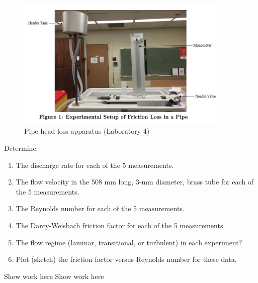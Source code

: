 \documentclass[12pt]{article}
\begin{document}
\begin{figure}[h!] %
   \centering
   \includegraphics[width=4in]{labsetup.png} 
   \caption{Pipe head loss apparatus (Laboratory 4)}
   \label{fig:labsetup}
\end{figure}

Determine:
\begin{enumerate}
\item The discharge rate for each of the 5 measurements.
\item The flow velocity in the 508 mm long, 3-mm diameter, brass tube for each of the 5 measurements.
\item The Reynolds number for each of the 5 measurements.
\item The Darcy-Weisbach friction factor for each of the 5 measurements.
\item The flow regime (laminar, transitional, or turbulent) in each experiment?
\item Plot (sketch) the friction factor versus Reynolds number for these data.
\end{enumerate}
\clearpage
Show work here
\clearpage
Show work here
\clearpage
\end{document}
